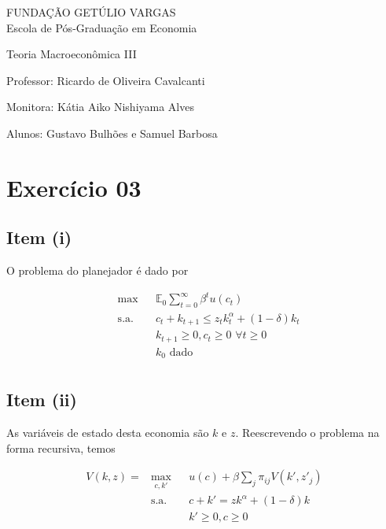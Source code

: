 \documentclass{article}
\begin{document}
\begin{flushleft}
FUNDAÇÃO GETÚLIO VARGAS \\

Escola de Pós-Graduação em Economia

Teoria Macroeconômica III

Professor: Ricardo de Oliveira Cavalcanti

Monitora: Kátia Aiko Nishiyama Alves

Alunos: Gustavo Bulhões e Samuel Barbosa
\end{flushleft}

\section*{Exercício 03}

\subsection*{Item (i)}

O problema do planejador é dado por 

\begin{equation}
\begin{aligned}
& \max & & \mathbb{E}_0 \sum_{t=0}^{\infty} \beta^t u(c_t) \\
& \text{s.a.} & &  c_t + k_{t+1} \leq z_t k_t^\alpha + (1-\delta) k_t \\
& & &  k_{t+1} \geq 0, c_t \geq 0 \,\, \forall t \geq 0  \\
& & &  k_0 \text{ dado} \\
\end{aligned}
\end{equation}

\subsection*{Item (ii)}

As variáveis de estado desta economia são $k$ e $z$. Reescrevendo o problema na forma recursiva, temos

\begin{equation}
\begin{aligned}
V(k, z) = & \max_{c, k'} & & u(c) + \beta \sum_j \pi_{ij} V(k', z'_j) \\
& \text{s.a.} & &  c + k' = z k^\alpha + (1-\delta) k \\
& & &  k' \geq 0, c \geq 0 \,\, \\
\end{aligned}
\end{equation}
\end{document}
